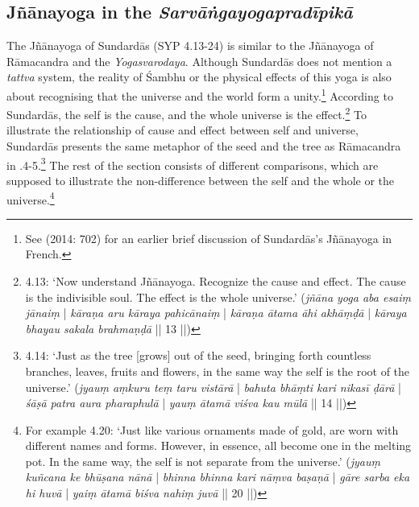 \subsection{Jñānayoga in the \textit{Sarvāṅgayogapradīpikā}}

The Jñānayoga of Sundardās (SYP 4.13-24) is similar to the Jñānayoga of Rāmacandra and the \textit{Yogasvarodaya}. Although Sundardās does not mention a \textit{tattva} system, the reality of Śambhu or the physical effects of this yoga is also about recognising that the universe and the world form a unity.\footnote{See \citeauthor{burger2014sarvangayogapradipika} (2014: 702) for an earlier brief discussion of Sundardās's Jñānayoga in French.} According to Sundardās, the self is the cause, and the whole universe is the effect.\footnote{ 4.13: `Now understand Jñānayoga. Recognize the cause and effect. The cause is the indivisible soul. The effect is the whole universe.' (\textit{jñāna yoga aba esaiṃ jānaiṃ} | \textit{kāraṇa aru kāraya pahicānaiṃ} | \textit{kāraṇa ātama āhi akhāṃḍā} | \textit{kāraya bhayau sakala brahmaṇḍā} || 13 ||)} To illustrate the relationship of cause and effect between self and universe, Sundardās presents the same metaphor of the seed and the tree as Rāmacandra in .4-5.\footnote{ 4.14: `Just as the tree [grows] out of the seed, bringing forth countless branches, leaves, fruits and flowers, in the same way the self is the root of the universe.' (\textit{jyauṃ aṃkuru teṃ taru vistārā} | \textit{bahuta bhāṃti kari nikasī ḍārā} | \textit{śāṣā patra aura pharaphulā} | \textit{yauṃ ātamā viśva kau mūlā} || 14 ||)} The rest of the section consists of different comparisons, which are supposed to illustrate the non-difference between the self and the whole or the universe.\footnote{For example  4.20: `Just like various ornaments made of gold, are worn with different names and forms. However, in essence, all become one in the melting pot. In the same way, the self is not separate from the universe.' (\textit{jyauṃ kuñcana ke bhūṣana nānā} | \textit{bhinna bhinna kari nāṃva baṣaṇā} | \textit{gāre sarba eka hi huvā} | \textit{yaiṃ ātamā biśva nahiṃ juvā} || 20 ||)}


